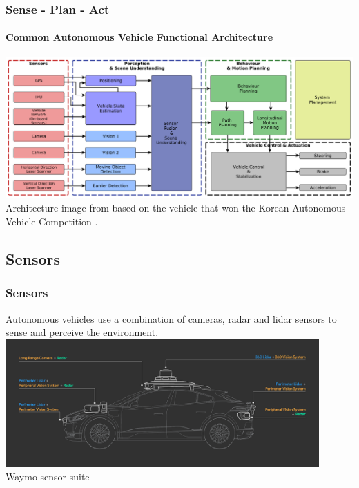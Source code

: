 \begin{frame}
\frametitle{Sense - Plan - Act}
\framesubtitle{Common Autonomous Vehicle Functional Architecture}
\includegraphics[width=\textwidth]{images/tas_2016_fig4_av_functional_architecture.png}
\tiny{Architecture image from \cite{Tas2016-sd} based on the vehicle that won the
Korean Autonomous Vehicle Competition \cite{Jo2014-na}}.
\end{frame}

\subsection{Sensors}

\begin{frame}
\frametitle{Sensors}
Autonomous vehicles use a combination of cameras, radar and lidar sensors to
sense and perceive the environment. \\
\vspace{0.25cm}
\centering
\includegraphics[width=0.9\textwidth]{images/waymo_sensors.png}\\
\footnotesize{Waymo sensor suite\footnotemark[1]}
\end{frame}

